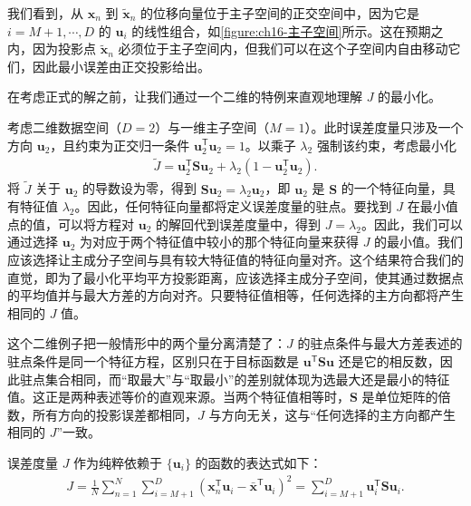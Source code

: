 \documentclass[../../main.tex]{subfiles}
\begin{document}
我们看到，从 $\bm{x}_n$ 到 $\tilde{\bm{x}}_n$ 的位移向量位于主子空间的正交空间中，因为它是 $i=M+1,\cdots,D$ 的 $\bm{u}_i$ 的线性组合，如\cref{figure:ch16-主子空间}所示。这在预期之内，因为投影点 $\tilde{\bm{x}}_n$ 必须位于主子空间内，但我们可以在这个子空间内自由移动它们，因此最小误差由正交投影给出。

在考虑正式的解之前，让我们通过一个二维的特例来直观地理解 $J$ 的最小化。

\begin{example}[ 二维数据的一维主子空间]\label{example:ch16-二维主成分}
考虑二维数据空间（$D=2$）与一维主子空间（$M=1$）。此时误差度量只涉及一个方向 $\bm{u}_2$，且约束为正交归一条件 $\bm{u}_2^{\mathsf T}\bm{u}_2=1$。以乘子 $\lambda_2$ 强制该约束，考虑最小化
\begin{align}
  \tilde{J}=\bm{u}_2^{\mathsf T}\bm{S}\bm{u}_2+\lambda_2\left(1-\bm{u}_2^{\mathsf T}\bm{u}_2\right).
  \label{align:ch16-误差Lagrange}
\end{align}
将 $\tilde{J}$ 关于 $\bm{u}_2$ 的导数设为零，得到 $\bm{S}\bm{u}_2=\lambda_2\bm{u}_2$，即 $\bm{u}_2$ 是 $\bm{S}$ 的一个特征向量，具有特征值 $\lambda_2$。因此，任何特征向量都将定义误差度量的驻点。要找到 $J$ 在最小值点的值，可以将方程对 $\bm{u}_2$ 的解回代到误差度量中，得到 $J=\lambda_2$。因此，我们可以通过选择 $\bm{u}_2$ 为对应于两个特征值中较小的那个特征向量来获得 $J$ 的最小值。我们应该选择让主成分子空间与具有较大特征值的特征向量对齐。这个结果符合我们的直觉，即为了最小化平均平方投影距离，应该选择主成分子空间，使其通过数据点的平均值并与最大方差的方向对齐。只要特征值相等，任何选择的主方向都将产生相同的 $J$ 值。
\end{example}

\begin{remark}
这个二维例子把一般情形中的两个量分离清楚了：$J$ 的驻点条件与最大方差表述的驻点条件是同一个特征方程，区别只在于目标函数是 $\bm{u}^{\mathsf T}\bm{S}\bm{u}$ 还是它的相反数，因此驻点集合相同，而“取最大”与“取最小”的差别就体现为选最大还是最小的特征值。这正是两种表述等价的直观来源。当两个特征值相等时，$\bm{S}$ 是单位矩阵的倍数，所有方向的投影误差都相同，$J$ 与方向无关，这与“任何选择的主方向都产生相同的 $J$”一致。
\end{remark}

误差度量 $J$ 作为纯粹依赖于 $\{\bm{u}_i\}$ 的函数的表达式如下：
\begin{align}
  J=\frac{1}{N}\sum_{n=1}^{N}\sum_{i=M+1}^{D}\left(\bm{x}_n^{\mathsf T}\bm{u}_i-\bar{\bm{x}}^{\mathsf T}\bm{u}_i\right)^2=\sum_{i=M+1}^{D}\bm{u}_i^{\mathsf T}\bm{S}\bm{u}_i.
  \label{align:ch16-误差函数}
\end{align}
\end{document}

